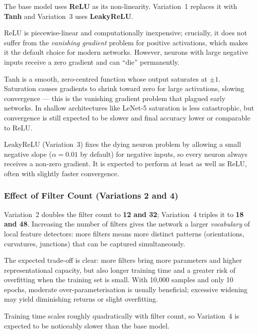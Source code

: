 \documentclass[12pt, a4paper]{article}
\begin{document}
The base model uses \textbf{ReLU} as its non-linearity. Variation~1 replaces it with
\textbf{Tanh} and Variation~3 uses \textbf{LeakyReLU}.

ReLU is piecewise-linear and computationally inexpensive; crucially, it does not suffer
from the \emph{vanishing gradient} problem for positive activations, which makes it the
default choice for modern networks. However, neurons with large negative inputs receive a
zero gradient and can ``die'' permanently.

Tanh is a smooth, zero-centred function whose output saturates at $\pm1$. Saturation
causes gradients to shrink toward zero for large activations, slowing convergence ---
this is the vanishing gradient problem that plagued early networks. In shallow
architectures like LeNet-5 saturation is less catastrophic, but convergence is still
expected to be slower and final accuracy lower or comparable to ReLU.

LeakyReLU (Variation~3) fixes the dying neuron problem by allowing a small negative
slope ($\alpha = 0.01$ by default) for negative inputs, so every neuron always receives
a non-zero gradient. It is expected to perform at least as well as ReLU, often with
slightly faster convergence.


\subsubsection{Effect of Filter Count (Variations 2 and 4)}

Variation~2 doubles the filter count to \textbf{12 and 32}; Variation~4 triples it to
\textbf{18 and 48}. Increasing the number of filters gives the network a larger
\emph{vocabulary} of local feature detectors: more filters means more distinct patterns
(orientations, curvatures, junctions) that can be captured simultaneously.

The expected trade-off is clear: more filters bring more parameters and higher
representational capacity, but also longer training time and a greater risk of overfitting
when the training set is small. With 10{,}000 samples and only 10 epochs, moderate
over-parameterisation is usually beneficial; excessive widening may yield diminishing
returns or slight overfitting.

Training time scales roughly quadratically with filter count, so Variation~4 is
expected to be noticeably slower than the base model.
\end{document}
